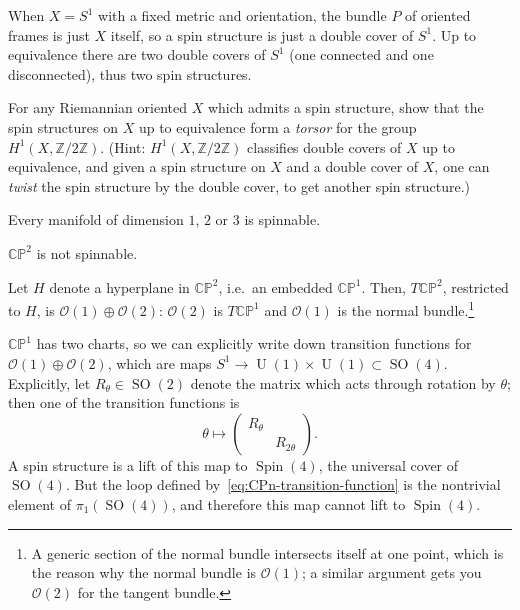 \documentclass[12pt,letterpaper,reqno]{article}
\numberwithin{equation}{section}
\newcommand{\cO}{\ensuremath{\mathcal O}}
\newcommand{\C}{\ensuremath{\mathbb C}}
\newcommand{\PP}{\ensuremath{\mathbb P}}
\newcommand{\Z}{\ensuremath{\mathbb Z}}
\newcommand{\ti}[1]{\textit{#1}}
\DeclareMathOperator{\Spin}{Spin}
\DeclareMathOperator{\SO}{SO}
\DeclareMathOperator{\U}{U}
\begin{document}
\begin{example} When $X = S^1$ with a fixed metric and orientation, 
the bundle $P$ of oriented frames is just $X$ itself, so a spin structure is just a double cover
of $S^1$. Up to equivalence there are two double covers of $S^1$ (one connected and one disconnected),
thus two spin structures.
\end{example}

\begin{exercise}
For any Riemannian oriented $X$ which admits a spin structure, 
show that the spin structures on $X$
up to equivalence form a \ti{torsor} for the group $H^1(X, \Z/2\Z)$.
(Hint: $H^1(X, \Z/2\Z)$ classifies double covers of $X$ up to equivalence, and 
given a spin structure on $X$ and a double cover of $X$, one can \ti{twist} the
spin structure by the double cover, to get another spin structure.)
\end{exercise}

\begin{prop} Every manifold of dimension $1$, $2$ or $3$ is spinnable.
\end{prop}

\begin{prop} $\C\PP^2$ is not spinnable.
\end{prop}
\begin{pf}
Let $H$ denote a hyperplane in $\C\PP^2$, i.e.\ an embedded $\C\PP^1$. Then, $T\C\PP^2$, restricted to $H$, is
$\cO(1)\oplus\cO(2)$: $\cO(2)$ is $T\C\PP^1$ and $\cO(1)$ is the normal bundle.\footnote{A generic section of the
normal bundle intersects itself at one point, which is the reason why the normal bundle is $\cO(1)$; a similar
argument gets you $\cO(2)$ for the tangent bundle.}

$\C\PP^1$ has two charts, so we can explicitly write down transition functions for $\cO(1)\oplus\cO(2)$, which are
maps $S^1\to\U(1)\times\U(1)\subset\SO(4)$. Explicitly, let $R_\theta\in\SO(2)$ denote the matrix which acts
through rotation by $\theta$; then one of the transition functions is
\begin{equation}
\label{eq:CPn-transition-function}
\theta\mapsto\begin{pmatrix} R_\theta\\& R_{2\theta}\end{pmatrix}.
\end{equation}
A spin structure is a lift of this map to $\Spin(4)$, the universal cover of $\SO(4)$. But the loop defined
by~\eqref{eq:CPn-transition-function} is the nontrivial element of $\pi_1(\SO(4))$, and therefore this map cannot
lift to $\Spin(4)$.
\end{pf}
\end{document}
